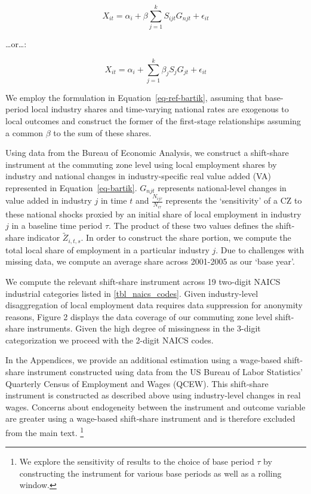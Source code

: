 \documentclass[
  10pt,
]{article}
\begin{document}
\[
X_{it} = \alpha_i + \beta\sum_{j=1}^{k}S_{ijt}G_{njt} + \epsilon_{it}
\]

\ldots or\ldots:

\[
X_{it} = \alpha_i + \sum_{j=1}^{k}\beta_{j}S_{j}G_{jt} + \epsilon_{it}
\]

We employ the formulation in Equation~\ref{eq-ref-bartik}, assuming that
base-period local industry shares and time-varying national rates are
exogenous to local outcomes and construct the former of the first-stage
relationships assuming a common \(\beta\) to the sum of these shares.

Using data from the Bureau of Economic Analysis, we construct a
shift-share instrument at the commuting zone level using local
employment shares by industry and national changes in industry-specific
real value added (VA) represented in Equation~\ref{eq-bartik}.
\(G_{njt}\) represents national-level changes in value added in industry
\(j\) in time \(t\) and \(\frac{N_{ij\tau}}{N_{i\tau}}\) represents the
`sensitivity' of a CZ to these national shocks proxied by an initial
share of local employment in industry \(j\) in a baseline time period
\(\tau\). The product of these two values defines the shift-share
indicator \(\tilde{Z}_{i,t,s}\). In order to construct the share
portion, we compute the total local share of employment in a particular
industry \(j\). Due to challenges with missing data, we compute an
average share across 2001-2005 as our `base year'.

We compute the relevant shift-share instrument across 19 two-digit NAICS
industrial categories listed in \autoref{tbl_naics_codes}. Given
industry-level disaggregation of local employment data requires data
suppression for anonymity reasons, Figure 2 displays the data coverage
of our commuting zone level shift-share instruments. Given the high
degree of missingness in the 3-digit categorization we proceed with the
2-digit NAICS codes.

In the Appendices, we provide an additional estimation using a
wage-based shift-share instrument constructed using data from the US
Bureau of Labor Statistics' Quarterly Census of Employment and Wages
(QCEW). This shift-share instrument is constructed as described above
using industry-level changes in real wages. Concerns about endogeneity
between the instrument and outcome variable are greater using a
wage-based shift-share instrument and is therefore excluded from the
main text.
\footnote{We explore the sensitivity of results to the choice of base period
    $\tau$ by constructing the instrument for various base periods as
    well as a rolling window.}
\end{document}
